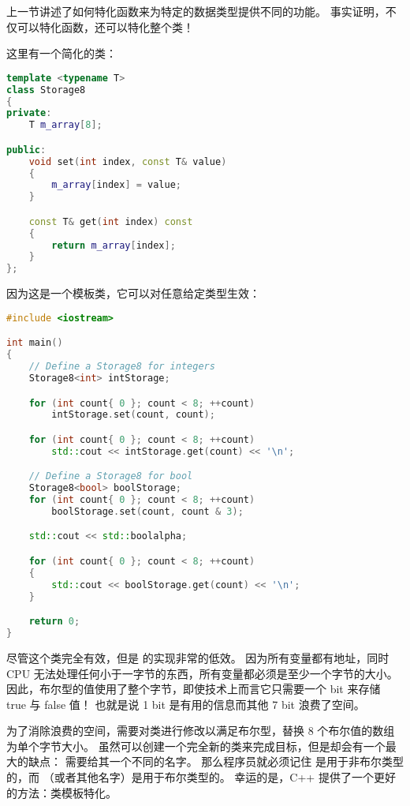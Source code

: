 \documentclass[../../LearnCpp.tex]{subfiles}
\begin{document}

上一节讲述了如何特化函数来为特定的数据类型提供不同的功能。
事实证明，不仅可以特化函数，还可以特化整个类！

这里有一个简化的类：

\begin{lstlisting}[language=C++]
template <typename T>
class Storage8
{
private:
    T m_array[8];

public:
    void set(int index, const T& value)
    {
        m_array[index] = value;
    }

    const T& get(int index) const
    {
        return m_array[index];
    }
};
\end{lstlisting}

因为这是一个模板类，它可以对任意给定类型生效：

\begin{lstlisting}[language=C++]
#include <iostream>

int main()
{
    // Define a Storage8 for integers
    Storage8<int> intStorage;

    for (int count{ 0 }; count < 8; ++count)
        intStorage.set(count, count);

    for (int count{ 0 }; count < 8; ++count)
        std::cout << intStorage.get(count) << '\n';

    // Define a Storage8 for bool
    Storage8<bool> boolStorage;
    for (int count{ 0 }; count < 8; ++count)
        boolStorage.set(count, count & 3);

    std::cout << std::boolalpha;

    for (int count{ 0 }; count < 8; ++count)
    {
        std::cout << boolStorage.get(count) << '\n';
    }

    return 0;
}
\end{lstlisting}

尽管这个类完全有效，但是  的实现非常的低效。
因为所有变量都有地址，同时 CPU 无法处理任何小于一字节的东西，所有变量都必须是至少一个字节的大小。
因此，布尔型的值使用了整个字节，即使技术上而言它只需要一个 bit 来存储 true 与 false 值！
也就是说 1 bit 是有用的信息而其他 7 bit 浪费了空间。

为了消除浪费的空间，需要对类进行修改以满足布尔型，替换 8 个布尔值的数组为单个字节大小。
虽然可以创建一个完全新的类来完成目标，但是却会有一个最大的缺点：
需要给其一个不同的名字。
那么程序员就必须记住  是用于非布尔类型的，而 （或者其他名字）是用于布尔类型的。
幸运的是，C++ 提供了一个更好的方法：类模板特化。
\end{document}
